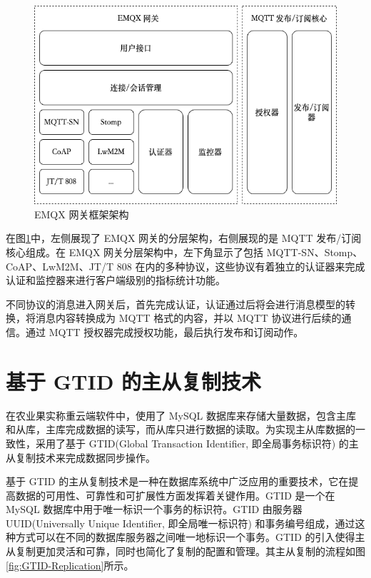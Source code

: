 \begin{figure}[H]
    \centering
    \includegraphics[width=0.8\linewidth]{../design/EMQX-Gateway.png}
    \caption{EMQX 网关框架架构}
    \label{fig:EMQX-Gateway}
\end{figure}

在图\ref{fig:EMQX-Gateway}中，左侧展现了 EMQX 网关的分层架构，右侧展现的是 MQTT 发布/订阅核心组成。在 EMQX 网关分层架构中，左下角显示了包括 MQTT-SN、Stomp、CoAP、LwM2M、JT/T 808 在内的多种协议，这些协议有着独立的认证器来完成认证和监控器来进行客户端级别的指标统计功能。

不同协议的消息进入网关后，首先完成认证，认证通过后将会进行消息模型的转换，将消息内容转换成为 MQTT 格式的内容，并以 MQTT 协议进行后续的通信。通过 MQTT 授权器完成授权功能，最后执行发布和订阅动作。

\section{基于 GTID 的主从复制技术}

在农业果实称重云端软件中，使用了 MySQL 数据库来存储大量数据，包含主库和从库，主库完成数据的读写，而从库只进行数据的读取。为实现主从库数据的一致性，采用了基于 GTID(Global Transaction Identifier, 即全局事务标识符) 的主从复制技术来完成数据同步操作。

基于 GTID 的主从复制技术是一种在数据库系统中广泛应用的重要技术，它在提高数据的可用性、可靠性和可扩展性方面发挥着关键作用。GTID 是一个在 MySQL 数据库中用于唯一标识一个事务的标识符。GTID 由服务器 UUID(Universally Unique Identifier, 即全局唯一标识符) 和事务编号组成，通过这种方式可以在不同的数据库服务器之间唯一地标识一个事务。GTID 的引入使得主从复制更加灵活和可靠，同时也简化了复制的配置和管理。其主从复制的流程如图\ref{fig:GTID-Replication}所示。

